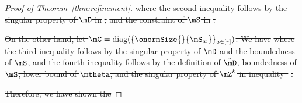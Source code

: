 \documentclass[lettersize,onecolumn,journal]{IEEEtran}
\theoremstyle{definition}
\theoremstyle{definition}
\providecommand{\DIFdeltex}[1]{{\protect\color{red}\sout{#1}}}                      %
\providecommand{\DIFdel}[1]{\texorpdfstring{\DIFdeltex{#1}}{}} %
\begin{document}
\begin{proof}[Proof of Theorem~\ref{thm:refinement}]
\DIFdel{where the second inequality follows by the singular property of $\mD$ in }%
\DIFdel{, }%
\DIFdel{and the constraint of $\mS$ in }%
\DIFdel{.
    }%

\DIFdel{On the other hand, let $\mC = \text{diag}(\{\onormSize{}{\mS_{a:}}\}_{a \in [r]})$. We have 
    }%
\DIFdel{where the third inequality follows by the singular property of $\mD$ and the boundedness of $\mS$, and the fourth inequality follows by the definition of $\tilde \mD$, boundedness of $\mS$, lower bound of $\mtheta$, and the singular property of $\mZ^k$ in inequality~}%
\DIFdel{. 
    }%

\DIFdel{Therefore, we have shown the 
    }%


\end{proof}
\end{document}
